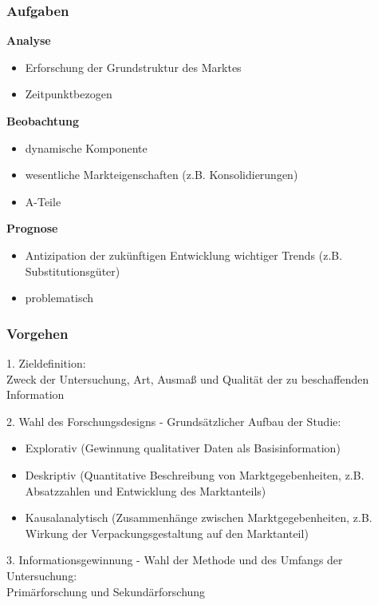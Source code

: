 \documentclass[a4paper,11pt, twoside]{article}
\newcommand\mpar[1]{\marginpar {\flushleft\small #1}}
\begin{document}
\subsubsection*{Aufgaben}

\textbf{Analyse}
\begin{itemize}
	\item Erforschung der Grundstruktur des Marktes
	\item Zeitpunktbezogen 
\end{itemize}

\textbf{Beobachtung}
\begin{itemize}
	\item dynamische Komponente
	\item wesentliche Markteigenschaften (z.B. Konsolidierungen)
	\item A-Teile 
\end{itemize}

\textbf{Prognose}
\begin{itemize}
	\item Antizipation der zukünftigen Entwicklung wichtiger Trends (z.B. Substitutionsgüter)
	\item problematisch
\end{itemize}

\subsubsection*{Vorgehen}
1. Zieldefinition:\\
Zweck der Untersuchung, Art, Ausmaß und Qualität der zu beschaffenden Information

2. Wahl des Forschungsdesigns - Grundsätzlicher Aufbau der Studie:
\begin{itemize}
	\item Explorativ (Gewinnung qualitativer Daten als Basisinformation)
\mpar{\textcolor{red}{Beispiel: "`Welche Eigenschaften muß eine Kaffeesorte für ältere Menschen aufweisen?"'}}
	\item Deskriptiv (Quantitative Beschreibung von Marktgegebenheiten, z.B. Absatzzahlen und Entwicklung des Marktanteils)
	\item Kausalanalytisch (Zusammenhänge zwischen Marktgegebenheiten, z.B. Wirkung der Verpackungsgestaltung auf den Marktanteil)
\end{itemize}

3. Informationsgewinnung - Wahl der Methode und des Umfangs der Untersuchung:\\
Primärforschung und Sekundärforschung
\end{document}
